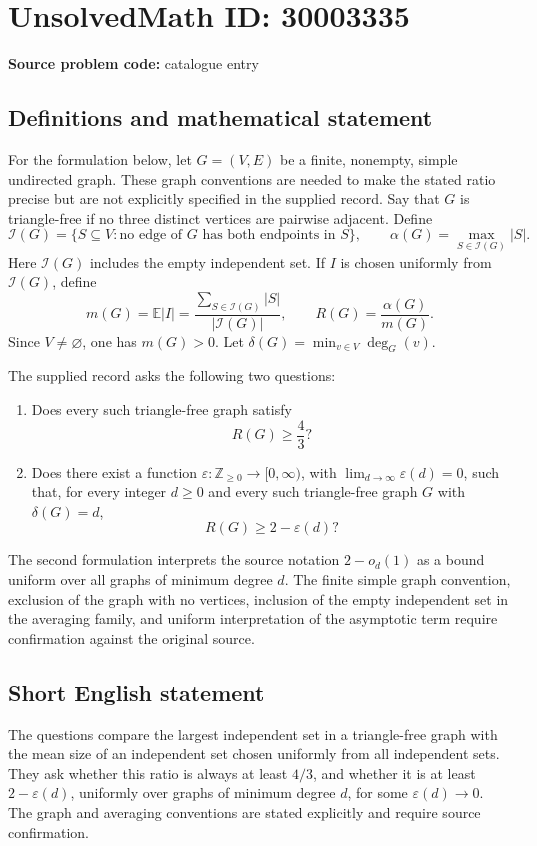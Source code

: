 \documentclass[11pt]{article}
\begin{document}
\section*{UnsolvedMath ID: 30003335}
\textbf{Source problem code:} catalogue entry
\subsection{Definitions and mathematical statement}
For the formulation below, let \(G=(V,E)\) be a finite, nonempty, simple undirected graph. These graph conventions are needed to make the stated ratio precise but are not explicitly specified in the supplied record. Say that \(G\) is triangle-free if no three distinct vertices are pairwise adjacent. Define
\[
\mathcal I(G)=\{S\subseteq V: \text{no edge of }G\text{ has both endpoints in }S\},
\qquad
\alpha(G)=\max_{S\in\mathcal I(G)}|S|.
\]
Here \(\mathcal I(G)\) includes the empty independent set. If \(I\) is chosen uniformly from \(\mathcal I(G)\), define
\[
 m(G)=\mathbb E|I|=\frac{\sum_{S\in\mathcal I(G)}|S|}{|\mathcal I(G)|},
 \qquad R(G)=\frac{\alpha(G)}{m(G)}.
\]
Since \(V\ne\varnothing\), one has \(m(G)>0\). Let \(\delta(G)=\min_{v\in V}\deg_G(v)\).

The supplied record asks the following two questions:
\begin{enumerate}
\item Does every such triangle-free graph satisfy
\[
 R(G)\ge \frac43?
\]
\item Does there exist a function \(\varepsilon:\mathbb Z_{\ge0}\to[0,\infty)\), with \(\lim_{d\to\infty}\varepsilon(d)=0\), such that, for every integer \(d\ge0\) and every such triangle-free graph \(G\) with \(\delta(G)=d\),
\[
 R(G)\ge 2-\varepsilon(d)?
\]
\end{enumerate}
The second formulation interprets the source notation \(2-o_d(1)\) as a bound uniform over all graphs of minimum degree \(d\). The finite simple graph convention, exclusion of the graph with no vertices, inclusion of the empty independent set in the averaging family, and uniform interpretation of the asymptotic term require confirmation against the original source.
\subsection{Short English statement}
The questions compare the largest independent set in a triangle-free graph with the mean size of an independent set chosen uniformly from all independent sets. They ask whether this ratio is always at least \(4/3\), and whether it is at least \(2-\varepsilon(d)\), uniformly over graphs of minimum degree \(d\), for some \(\varepsilon(d)\to0\). The graph and averaging conventions are stated explicitly and require source confirmation.
\end{document}

